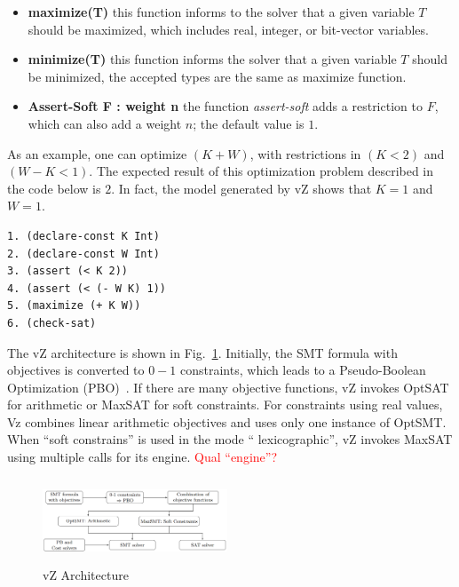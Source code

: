 \begin{itemize}
\item{\textbf{maximize(T)}
this function informs to the solver that a given variable $T$ should be maximized, which includes real, integer, or bit-vector variables.}
\item{\textbf{minimize(T)}
this function informs the solver that a given variable $T$ should be minimized, the accepted types are the same as maximize function.}
\item{\textbf{Assert-Soft F : weight n}
the function \textit{assert-soft} adds a restriction to $F$, which can also add a weight $n$; the default value is $1$.}
\end{itemize}

As an example, one can optimize $\left(K + W\right)$, with restrictions in $\left(K < 2\right)$ and $\left(W - K < 1\right)$. The expected result of this optimization problem described in the code below is $2$. In fact, the model generated by vZ shows that $K = 1$ and $W = 1$.

\begin{lstlisting}[caption=Example of SMT formula using vZ, label=vZ]
1. (declare-const K Int) 
2. (declare-const W Int)
3. (assert (< K 2)) 
4. (assert (< (- W K) 1))
5. (maximize (+ K W)) 
6. (check-sat)
\end{lstlisting}

The vZ architecture is shown in Fig.~\ref{vZ-Architecture}. Initially, the SMT formula with objectives is converted to $0-1$ constraints, which leads to a Pseudo-Boolean Optimization (PBO)~\cite{Barth1995,Vasco2005}. If there are many objective functions, vZ invokes OptSAT for arithmetic or MaxSAT for soft constraints. For constraints using real values, Vz combines linear arithmetic objectives and uses only one instance of OptSMT. When ``soft constrains'' is used in the mode `` lexicographic'', vZ invokes MaxSAT using multiple calls for its engine. \textcolor{red}{Qual ``engine''?} 
%
\begin{figure}[ht]
	\centering
  \includegraphics[width=0.49\textwidth, height=95px]{Image/vzArch.png} 
	\caption{vZ Architecture~\cite{Bjorner2015}}
	\label{vZ-Architecture}
\end{figure}

